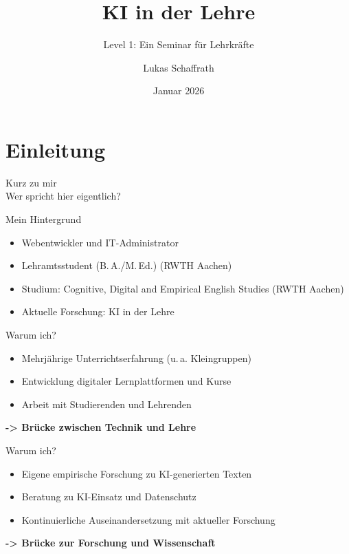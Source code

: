 \documentclass[14pt, aspectratio=169]{beamer}
\title{KI in der Lehre}
\subtitle{Level 1: Ein Seminar für Lehrkräfte}
\author{Lukas Schaffrath}
\date{Januar 2026}
\begin{document}

\maketitle


\section{Einleitung}

\begin{frame}{}
  \begin{center}
    \Huge Kurz zu mir\\
    \vspace{0.4cm}
    \Large Wer spricht hier eigentlich?
  \end{center}
\end{frame}

\begin{frame}{Mein Hintergrund}
\begin{itemize}
    \item Webentwickler und IT-Administrator
    \item Lehramtsstudent (B.\,A./M.\,Ed.) (RWTH Aachen)
    \item Studium: Cognitive, Digital and Empirical English Studies (RWTH Aachen)
    \item Aktuelle Forschung: KI in der Lehre
\end{itemize}
\end{frame}

\begin{frame}{Warum ich?}
\begin{itemize}
    \item Mehrjährige Unterrichtserfahrung (u.\,a. Kleingruppen)
    \item Entwicklung digitaler Lernplattformen und Kurse
    \item Arbeit mit Studierenden und Lehrenden
\end{itemize}
\textbf{-> Brücke zwischen Technik und Lehre}
\end{frame}

\begin{frame}{Warum ich?}
\begin{itemize}
    \item Eigene empirische Forschung zu KI-generierten Texten
    \item Beratung zu KI-Einsatz und Datenschutz
    \item Kontinuierliche Auseinandersetzung mit aktueller Forschung
\end{itemize}
\textbf{-> Brücke zur Forschung und Wissenschaft}
\end{frame}
\end{document}
